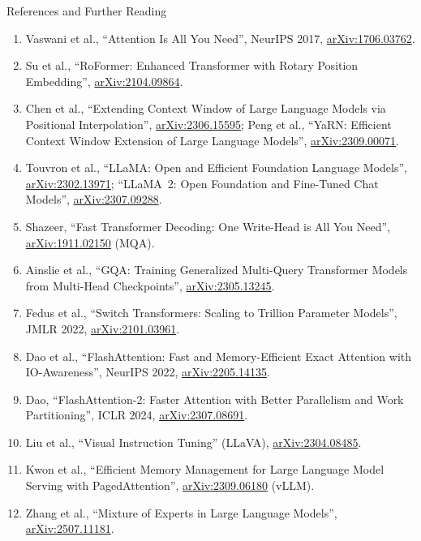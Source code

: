 \begin{frame}[allowframebreaks,t]{References and Further Reading}
  \footnotesize
  \begin{enumerate}
    \item Vaswani et al., ``Attention Is All You Need'', NeurIPS 2017, \href{https://arxiv.org/abs/1706.03762}{arXiv:1706.03762}.
    \item Su et al., ``RoFormer: Enhanced Transformer with Rotary Position Embedding'', \href{https://arxiv.org/abs/2104.09864}{arXiv:2104.09864}.
    \item Chen et al., ``Extending Context Window of Large Language Models via Positional Interpolation'', \href{https://arxiv.org/abs/2306.15595}{arXiv:2306.15595}; Peng et al., ``YaRN: Efficient Context Window Extension of Large Language Models'', \href{https://arxiv.org/abs/2309.00071}{arXiv:2309.00071}.
    \item Touvron et al., ``LLaMA: Open and Efficient Foundation Language Models'', \href{https://arxiv.org/abs/2302.13971}{arXiv:2302.13971}; ``LLaMA~2: Open Foundation and Fine-Tuned Chat Models'', \href{https://arxiv.org/abs/2307.09288}{arXiv:2307.09288}.
    \item Shazeer, ``Fast Transformer Decoding: One Write-Head is All You Need'', \href{https://arxiv.org/abs/1911.02150}{arXiv:1911.02150} (MQA).
    \item Ainslie et al., ``GQA: Training Generalized Multi-Query Transformer Models from Multi-Head Checkpoints'', \href{https://arxiv.org/abs/2305.13245}{arXiv:2305.13245}.
    \item Fedus et al., ``Switch Transformers: Scaling to Trillion Parameter Models'', JMLR 2022, \href{https://arxiv.org/abs/2101.03961}{arXiv:2101.03961}.
    \item Dao et al., ``FlashAttention: Fast and Memory-Efficient Exact Attention with IO-Awareness'', NeurIPS 2022, \href{https://arxiv.org/abs/2205.14135}{arXiv:2205.14135}.
    \item Dao, ``FlashAttention-2: Faster Attention with Better Parallelism and Work Partitioning'', ICLR 2024, \href{https://arxiv.org/abs/2307.08691}{arXiv:2307.08691}.
    \item Liu et al., ``Visual Instruction Tuning'' (LLaVA), \href{https://arxiv.org/abs/2304.08485}{arXiv:2304.08485}.
    \item Kwon et al., ``Efficient Memory Management for Large Language Model Serving with PagedAttention'', \href{https://arxiv.org/abs/2309.06180}{arXiv:2309.06180} (vLLM).
    \item Zhang et al., ``Mixture of Experts in Large Language Models'', \href{https://arxiv.org/abs/2507.11181}{arXiv:2507.11181}.

\end{enumerate}
\end{frame}
